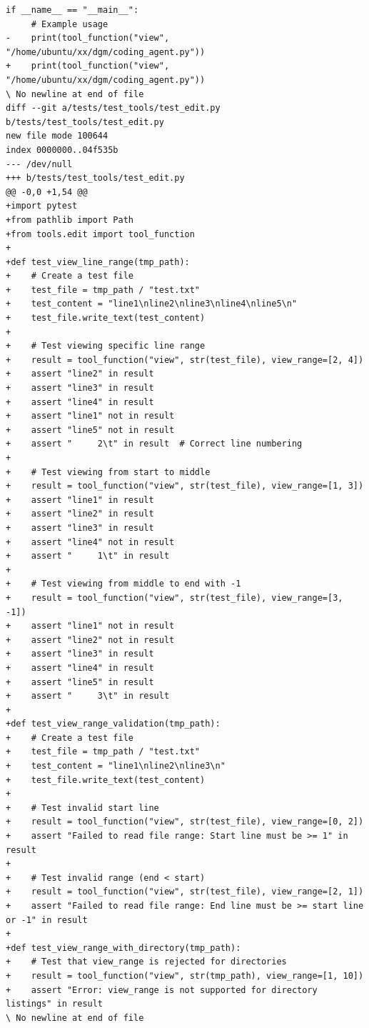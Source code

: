 \documentclass{article}
\begin{document}
\begin{lstlisting}[style=diffstyle]
 if __name__ == "__main__":
     # Example usage
-    print(tool_function("view", "/home/ubuntu/xx/dgm/coding_agent.py"))
+    print(tool_function("view", "/home/ubuntu/xx/dgm/coding_agent.py"))
\ No newline at end of file
diff --git a/tests/test_tools/test_edit.py b/tests/test_tools/test_edit.py
new file mode 100644
index 0000000..04f535b
--- /dev/null
+++ b/tests/test_tools/test_edit.py
@@ -0,0 +1,54 @@
+import pytest
+from pathlib import Path
+from tools.edit import tool_function
+
+def test_view_line_range(tmp_path):
+    # Create a test file
+    test_file = tmp_path / "test.txt"
+    test_content = "line1\nline2\nline3\nline4\nline5\n"
+    test_file.write_text(test_content)
+
+    # Test viewing specific line range
+    result = tool_function("view", str(test_file), view_range=[2, 4])
+    assert "line2" in result
+    assert "line3" in result
+    assert "line4" in result
+    assert "line1" not in result
+    assert "line5" not in result
+    assert "     2\t" in result  # Correct line numbering
+
+    # Test viewing from start to middle
+    result = tool_function("view", str(test_file), view_range=[1, 3])
+    assert "line1" in result
+    assert "line2" in result
+    assert "line3" in result
+    assert "line4" not in result
+    assert "     1\t" in result
+
+    # Test viewing from middle to end with -1
+    result = tool_function("view", str(test_file), view_range=[3, -1])
+    assert "line1" not in result
+    assert "line2" not in result
+    assert "line3" in result
+    assert "line4" in result
+    assert "line5" in result
+    assert "     3\t" in result
+
+def test_view_range_validation(tmp_path):
+    # Create a test file
+    test_file = tmp_path / "test.txt"
+    test_content = "line1\nline2\nline3\n"
+    test_file.write_text(test_content)
+
+    # Test invalid start line
+    result = tool_function("view", str(test_file), view_range=[0, 2])
+    assert "Failed to read file range: Start line must be >= 1" in result
+
+    # Test invalid range (end < start)
+    result = tool_function("view", str(test_file), view_range=[2, 1])
+    assert "Failed to read file range: End line must be >= start line or -1" in result
+
+def test_view_range_with_directory(tmp_path):
+    # Test that view_range is rejected for directories
+    result = tool_function("view", str(tmp_path), view_range=[1, 10])
+    assert "Error: view_range is not supported for directory listings" in result
\ No newline at end of file
\end{lstlisting}
\end{document}
